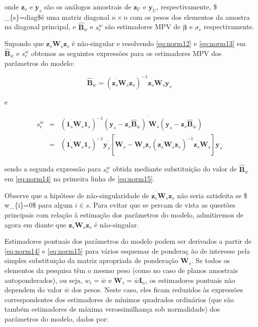 \documentclass[]{book}
\begin{document}
onde \(\mathbf{z}_{s}\) e \(\mathbf{y}_{s}\) são os análogos amostrais
de \(\mathbf{z}_{U}\) e \(\mathbf{y}_{U}\), respectivamente,
\$
\_\{s\}=diag \$é
uma matriz diagonal \(n\times n\) com os pesos dos elementos da amostra
na diagonal principal, e \(\mathbf{\hat{B}}_{w}\) e \(s_{e}^{w}\) são
estimadores MPV de \(\mathbf{\beta }\) e \(\sigma _{e}\)
respectivamente.

Supondo que \(\mathbf{z}_{s}^{^{\prime }}\mathbf{W}_{s}\mathbf{z}_{s}\)
é não-singular e resolvendo \eqref{eq:norm12} e \eqref{eq:norm13} em
\(\mathbf{\hat{B} }_{w}\) e \(s_{e}^{w}\) obtemos as seguintes
expressões para os estimadores MPV dos parâmetros do modelo:

\begin{equation}
\widehat{\mathbf{B}}_{w}=\left( \mathbf{z}_{s}^{^{\prime }}\mathbf{W}_{s}
\mathbf{z}_{s}\right) ^{-1}\mathbf{z}_{s}^{^{\prime }}\mathbf{W}_{s}\mathbf{y
}_{s}  \label{eq:norm14}
\end{equation}

e

\begin{eqnarray}
s_{e}^{w} &=&\left( \mathbf{1}_{s}^{^{\prime }}\mathbf{W}_{s}\mathbf{1}
_{s}\right) ^{-1}\left( \mathbf{y}_{s}-\mathbf{z}_{s}\widehat{\mathbf{B}}
_{w}\right) ^{^{\prime }}\mathbf{W}_{s}\left( \mathbf{y}_{s}-\mathbf{z}_{s}
\widehat{\mathbf{B}}_{w}\right)  \label{eq:norm15} \\
&=&\left( \mathbf{1}_{s}^{^{\prime }}\mathbf{W}_{s}\mathbf{1}_{s}\right)
^{-1}\mathbf{y}_{s}^{^{\prime }}\left[ \mathbf{W}_{s}-\mathbf{W}_{s}\mathbf{z
}_{s}\left( \mathbf{z}_{s}^{^{\prime }}\mathbf{W}_{s}\mathbf{z}_{s}\right)
^{-1}\mathbf{z}_{s}^{^{\prime }}\mathbf{W}_{s}\right] \mathbf{y}_{s} 
\nonumber
\end{eqnarray}

sendo a segunda expressão para \(s_{e}^{w}\) obtida mediante
substituição do valor de \(\widehat{\mathbf{B}}_{w}\) em \eqref{eq:norm14}
na primeira linha de \eqref{eq:norm15}.

Observe que a hipótese de não-singularidade de
\(\mathbf{z} _{s}^{^{\prime }}\mathbf{W}_{s}\mathbf{z}_{s}\) não seria
satisfeita se \$ w\_\{i\}=0\$ para algum \(i\in s\). Para evitar que se
percam de vista as questões principais com relação à estimação dos
parâmetros do modelo, admitiremos de agora em diante que
\(\mathbf{z} _{s}^{^{\prime }}\mathbf{W}_{s}\mathbf{z}_{s}\) é
não-singular.

Estimadores pontuais dos parâmetros do modelo podem ser derivados a
partir de \eqref{eq:norm14} e \eqref{eq:norm15} para vários esquemas de
pondera\c{c
}ão de interesse pela simples substituição da matriz apropriada de
ponderação \(\mathbf{W}_{s}\). Se todos os elementos da pesquisa têm o
mesmo peso (como no caso de planos amostrais autoponderados), ou seja,
\(w_{i}=\bar{w}\) e \(\mathbf{W}_{s}=\bar{w}\mathbf{I}_{n}\), os
estimadores pontuais não dependem do valor \(\bar{w}\) dos pesos. Neste
caso, eles ficam reduzidos às expressões correspondentes dos estimadores
de mínimos quadrados ordinários (que são também estimadores de máxima
verossimilhança sob normalidade) dos parâmetros do modelo, dados por:
\end{document}
